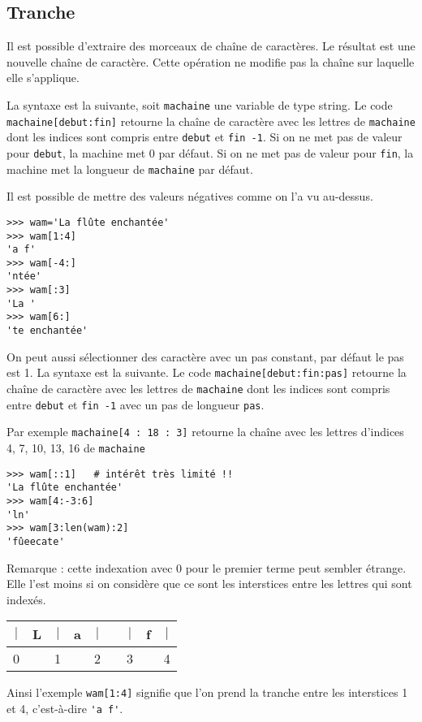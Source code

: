 \subsection{Tranche}
Il est possible d'extraire des morceaux de chaîne de caractères. Le résultat est une nouvelle chaîne de caractère. Cette opération ne modifie pas la chaîne sur laquelle elle s'applique.\par
La syntaxe est la suivante, soit \lstinline?machaine? une variable de type string. Le code \lstinline?machaine[debut:fin]? retourne la chaîne de caractère avec les lettres de \lstinline?machaine? dont les indices sont compris entre \lstinline?debut? et \lstinline?fin -1?. Si on ne met pas de valeur pour \lstinline?debut?, la machine met 0 par défaut. Si on ne met pas de valeur pour \lstinline?fin?, la machine met la longueur de \lstinline?machaine? par défaut.  \par
Il est possible de mettre des valeurs négatives comme on l'a vu au-dessus.
\begin{lstlisting}
>>> wam='La flûte enchantée'
>>> wam[1:4]
'a f'
>>> wam[-4:]
'ntée'
>>> wam[:3]
'La '
>>> wam[6:]
'te enchantée'
\end{lstlisting}
On peut aussi sélectionner des caractère avec un pas constant, par défaut le pas est 1. La syntaxe est la suivante. Le code \lstinline?machaine[debut:fin:pas]? retourne la chaîne de caractère avec les lettres de \lstinline?machaine? dont les indices sont compris entre \lstinline?debut? et \lstinline?fin -1? avec un pas de longueur \lstinline?pas?.\par
Par exemple \lstinline?machaine[4 : 18 : 3]?  retourne la chaîne avec les lettres d'indices 4, 7, 10, 13, 16 de \lstinline?machaine?
\begin{lstlisting}
>>> wam[::1]   # intérêt très limité !!
'La flûte enchantée'
>>> wam[4:-3:6]
'ln'
>>> wam[3:len(wam):2]
'fûeecate'\end{lstlisting}
Remarque : cette indexation avec 0 pour le premier terme peut sembler étrange. Elle l'est moins si on considère que ce sont les interstices entre les lettres qui sont indexés.\par
\begin{tabular}{ccccccccc}
 $\vert$ &L & $\vert$ & a& $\vert$ &  &$\vert$ & f&$\vert$\\
  \hline
  0 & & 1 && 2 && 3&&4\\
\end{tabular}\par
Ainsi l'exemple \lstinline?wam[1:4]? signifie que l'on prend la tranche entre les interstices 1 et 4, c'est-à-dire \lstinline?'a f'?.\par

